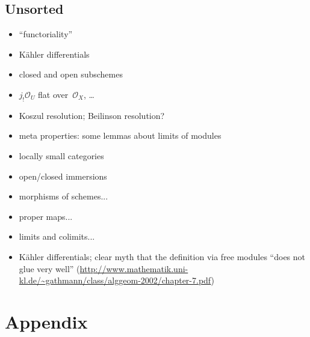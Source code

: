 \documentclass[10pt,reqno,a4paper]{amsbook}
\theoremstyle{definition}
\theoremstyle{plain}
\theoremstyle{remark}
\renewcommand{\O}{\mathcal{O}}
\newcommand{\?}{\,{:}\,}
\renewcommand{\_}{\mathpunct{.}\,}
\begin{document}
\section{Unsorted}
\begin{itemize}
\item ``functoriality''
\item Kähler differentials
\item closed and open subschemes
\item $j_! \O_U$ flat over~$\O_X$, \ldots
\item Koszul resolution; Beilinson resolution?
\item meta properties: some lemmas about limits of modules
\item locally small categories
\item open/closed immersions
\item morphisms of schemes...
\item proper maps...
\item limits and colimits...
\item Kähler differentials; clear myth that the definition via free modules
``does not glue very well''
(\url{http://www.mathematik.uni-kl.de/~gathmann/class/alggeom-2002/chapter-7.pdf})
\end{itemize}


\chapter*{Appendix}

\setcounter{saved-section-number}{\value{section}}
\end{document}
